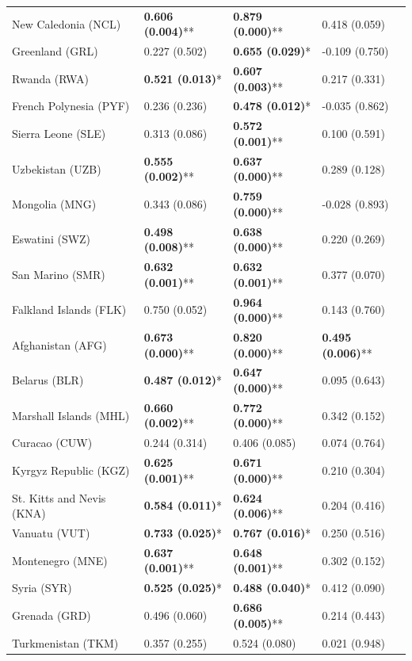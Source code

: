 \begin{longtable}{p{4cm}p{3cm}p{3cm}p{3cm}}
New Caledonia (NCL) & \textbf{0.606 (0.004)}** & \textbf{0.879 (0.000)}** & 0.418 (0.059) \\
Greenland (GRL) & 0.227 (0.502) & \textbf{0.655 (0.029)}* & -0.109 (0.750) \\
Rwanda (RWA) & \textbf{0.521 (0.013)}* & \textbf{0.607 (0.003)}** & 0.217 (0.331) \\
French Polynesia (PYF) & 0.236 (0.236) & \textbf{0.478 (0.012)}* & -0.035 (0.862) \\
Sierra Leone (SLE) & 0.313 (0.086) & \textbf{0.572 (0.001)}** & 0.100 (0.591) \\
Uzbekistan (UZB) & \textbf{0.555 (0.002)}** & \textbf{0.637 (0.000)}** & 0.289 (0.128) \\
Mongolia (MNG) & 0.343 (0.086) & \textbf{0.759 (0.000)}** & -0.028 (0.893) \\
Eswatini (SWZ) & \textbf{0.498 (0.008)}** & \textbf{0.638 (0.000)}** & 0.220 (0.269) \\
San Marino (SMR) & \textbf{0.632 (0.001)}** & \textbf{0.632 (0.001)}** & 0.377 (0.070) \\
Falkland Islands (FLK) & 0.750 (0.052) & \textbf{0.964 (0.000)}** & 0.143 (0.760) \\
Afghanistan (AFG) & \textbf{0.673 (0.000)}** & \textbf{0.820 (0.000)}** & \textbf{0.495 (0.006)}** \\
Belarus (BLR) & \textbf{0.487 (0.012)}* & \textbf{0.647 (0.000)}** & 0.095 (0.643) \\
Marshall Islands (MHL) & \textbf{0.660 (0.002)}** & \textbf{0.772 (0.000)}** & 0.342 (0.152) \\
Curacao (CUW) & 0.244 (0.314) & 0.406 (0.085) & 0.074 (0.764) \\
Kyrgyz Republic (KGZ) & \textbf{0.625 (0.001)}** & \textbf{0.671 (0.000)}** & 0.210 (0.304) \\
St. Kitts and Nevis (KNA) & \textbf{0.584 (0.011)}* & \textbf{0.624 (0.006)}** & 0.204 (0.416) \\
Vanuatu (VUT) & \textbf{0.733 (0.025)}* & \textbf{0.767 (0.016)}* & 0.250 (0.516) \\
Montenegro (MNE) & \textbf{0.637 (0.001)}** & \textbf{0.648 (0.001)}** & 0.302 (0.152) \\
Syria (SYR) & \textbf{0.525 (0.025)}* & \textbf{0.488 (0.040)}* & 0.412 (0.090) \\
Grenada (GRD) & 0.496 (0.060) & \textbf{0.686 (0.005)}** & 0.214 (0.443) \\
Turkmenistan (TKM) & 0.357 (0.255) & 0.524 (0.080) & 0.021 (0.948) \\

\end{longtable}
